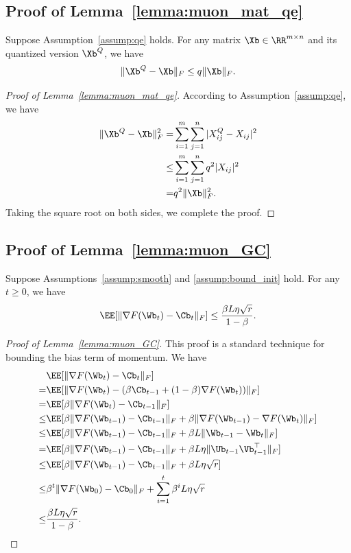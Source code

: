\documentclass[11pt, letterpaper]{article}
\begin{document}
\subsection{Proof of Lemma~\ref{lemma:muon_mat_qe}}
\begin{lemma}\label{lemma:muon_mat_qe}
    Suppose Assumption~\ref{assump:qe} holds. For any matrix $\Xb\in\RR^{m\times n}$ and its quantized version $\Xb^Q$, we have
    \begin{align*}
        \|\Xb^{Q} - \Xb\|_F \le q\|\Xb\|_F.
    \end{align*}
\end{lemma}
\begin{proof}[Proof of Lemma~\ref{lemma:muon_mat_qe}]
    According to Assumption~\ref{assump:qe}, we have
    \begin{align*}
        \|\Xb^Q - \Xb\|_F^2 =& \sum_{i=1}^m\sum_{j=1}^n |X_{ij}^Q - X_{ij}|^2 \\
        \le& \sum_{i=1}^m\sum_{j=1}^n q^2|X_{ij}|^2 \\
        =& q^2\|\Xb\|_F^2.
    \end{align*}
    Taking the square root on both sides, we complete the proof.
\end{proof}


\subsection{Proof of Lemma~\ref{lemma:muon_GC}}
\begin{lemma}\label{lemma:muon_GC}
    Suppose Assumptions~\ref{assump:smooth} and \ref{assump:bound_init} hold. For any $t\ge 0$, we have
    \begin{align*}
        \EE[\|\nabla F(\Wb_t)-\Cb_t\|_F] \le \frac{\beta L \eta \sqrt{r}}{1-\beta}.
    \end{align*}
\end{lemma}
\begin{proof}[Proof of Lemma~\ref{lemma:muon_GC}]
    This proof is a standard technique for bounding the bias term of momentum. We have
    \begin{align*}
    &\EE[\|\nabla F(\Wb_t)-\Cb_t\|_F]\notag\\
    =&\EE[\|\nabla F(\Wb_t)-(\beta \Cb_{t-1}+(1-\beta)\nabla F(\Wb_t))\|_F]\notag\\
    =&\EE[\beta\|\nabla F(\Wb_t)-\Cb_{t-1}\|_F]\notag\\
    \le&\EE[\beta\|\nabla F(\Wb_{t-1})-\Cb_{t-1}\|_F+\beta\|\nabla F(\Wb_{t-1})-\nabla F(\Wb_t)\|_F]\notag\\
    \le&\EE[\beta\|\nabla F(\Wb_{t-1})-\Cb_{t-1}\|_F +\beta L\|\Wb_{t-1}-\Wb_t\|_F]\notag\\
    =&\EE[\beta\|\nabla F(\Wb_{t-1})-\Cb_{t-1}\|_F+\beta L \eta\|\Ub_{t-1}\Vb_{t-1}^\top\|_F]\notag\\
    \le&\EE[\beta\|\nabla F(\Wb_{t-1})-\Cb_{t-1}\|_F+\beta L \eta \sqrt{r}]\notag\\
    \le&\beta^t\|\nabla F(\Wb_0)-\Cb_0\|_F+\sum_{i=1}^t \beta^i L \eta \sqrt{r} \notag\\
    \le& \frac{\beta L \eta \sqrt{r}}{1-\beta}.
\end{align*}
\end{proof}
\end{document}
